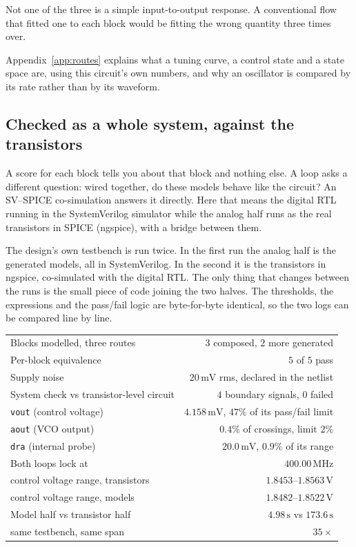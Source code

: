 \documentclass[11pt,a4paper]{article}
\newcommand{\unit}[1]{\,\textrm{#1}}
\begin{document}
\noindent Not one of the three is a simple input-to-output response.
A conventional flow that fitted one to each block would be fitting the
wrong quantity three times over.

\noindent Appendix~\ref{app:routes} explains what a tuning curve, a
control state and a state space are, using this circuit's own numbers,
and why an oscillator is compared by its rate rather than by its
waveform.

\subsection{Checked as a whole system, against the transistors}

A score for each block tells you about that block and nothing else.
A loop asks a different question: wired together, do these models
behave like the circuit? An SV--SPICE co-simulation answers it
directly. Here that means the digital RTL running in the SystemVerilog
simulator while the analog half runs as the real transistors in SPICE
(ngspice), with a bridge between them.

The design's own testbench is run twice. In the first run the analog
half is the generated models, all in SystemVerilog. In the second it
is the transistors in ngspice, co-simulated with the digital RTL. The
only thing that changes between the runs is the small piece of code
joining the two halves. The thresholds, the expressions and the
pass/fail logic are byte-for-byte identical, so the two logs can be
compared line by line.

\begin{center}
\begin{tabular}{@{}lr@{}}
\toprule
Blocks modelled, three routes        & $3$ composed, $2$ more generated \\
Per-block equivalence                & $5$ of $5$ pass \\
\midrule
Supply noise                         & $20\unit{mV}$ rms, declared in the netlist \\
System check vs transistor-level circuit & $4$ boundary signals, $0$ failed \\
\quad \texttt{vout} (control voltage) & $4.158\unit{mV}$, $47\%$ of its pass/fail limit \\
\quad \texttt{aout} (VCO output)      & $0.4\%$ of crossings, limit $2\%$ \\
\quad \texttt{dra} (internal probe)   & $20.0\unit{mV}$, $0.9\%$ of its range \\
\midrule
Both loops lock at                   & $400.00\unit{MHz}$ \\
\quad control voltage range, transistors & $1.8453$--$1.8563\unit{V}$ \\
\quad control voltage range, models      & $1.8482$--$1.8522\unit{V}$ \\
\midrule
Model half vs transistor half        & $4.98\unit{s}$ vs $173.6\unit{s}$ \\
\quad same testbench, same span       & $35\times$ \\
\bottomrule
\end{tabular}
\end{center}
\end{document}
